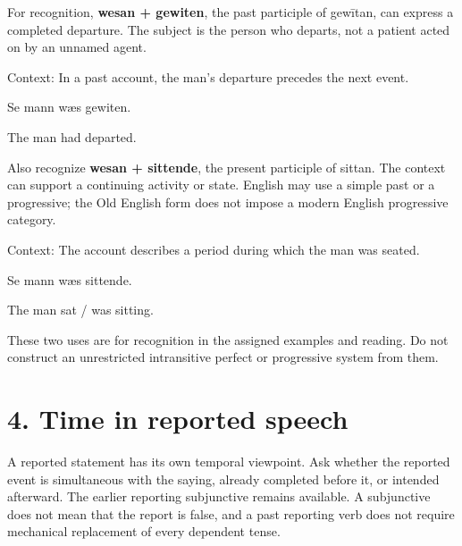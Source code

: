 For recognition, \textbf{wesan + gewiten}, the past participle of gewītan, can express a completed departure. The subject is the person who departs, not a patient acted on by an unnamed agent.

Context: In a past account, the man’s departure precedes the next event.

Se mann wæs gewiten.

The man had departed.

Also recognize \textbf{wesan + sittende}, the present participle of sittan. The context can support a continuing activity or state. English may use a simple past or a progressive; the Old English form does not impose a modern English progressive category.

Context: The account describes a period during which the man was seated.

Se mann wæs sittende.

The man sat /\allowbreak{} was sitting.

These two uses are for recognition in the assigned examples and reading. Do not construct an unrestricted intransitive perfect or progressive system from them.

\section*{4. Time in reported speech}

A reported statement has its own temporal viewpoint. Ask whether the reported event is simultaneous with the saying, already completed before it, or intended afterward. The earlier reporting subjunctive remains available. A subjunctive does not mean that the report is false, and a past reporting verb does not require mechanical replacement of every dependent tense.

